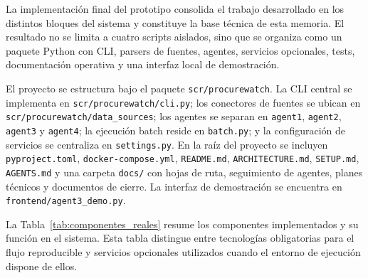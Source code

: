 \documentclass[11pt,a4paper,spanish]{book}
\numberwithin{equation}{chapter}
\numberwithin{figure}{chapter}
\begin{document}
La implementaci{\'o}n final del prototipo consolida el trabajo desarrollado en los distintos bloques
del sistema y constituye la base t{\'e}cnica de esta memoria. El resultado no se limita a cuatro
scripts aislados, sino que se organiza como un paquete Python con CLI, parsers de fuentes, agentes,
servicios opcionales, tests, documentaci{\'o}n operativa y una interfaz local de demostraci{\'o}n.

El proyecto se estructura bajo el paquete \texttt{scr/procurewatch}. La CLI central se implementa
en \texttt{scr/procurewatch/cli.py}; los conectores de fuentes se ubican en
\texttt{scr/procurewatch/data\_sources}; los agentes se separan en
\texttt{agent1}, \texttt{agent2}, \texttt{agent3} y \texttt{agent4}; la ejecuci{\'o}n batch reside en
\texttt{batch.py}; y la configuraci{\'o}n de servicios se centraliza en \texttt{settings.py}. En la
ra{\'i}z del proyecto se incluyen \texttt{pyproject.toml}, \texttt{docker-compose.yml},
\texttt{README.md}, \texttt{ARCHITECTURE.md}, \texttt{SETUP.md}, \texttt{AGENTS.md} y una carpeta
\texttt{docs/} con hojas de ruta, seguimiento de agentes, planes t{\'e}cnicos y documentos de
cierre. La interfaz de demostraci{\'o}n se encuentra en \texttt{frontend/agent3\_demo.py}.

La Tabla~\ref{tab:componentes_reales} resume los componentes implementados y su funci{\'o}n
en el sistema. Esta tabla distingue entre tecnolog{\'i}as obligatorias para el flujo reproducible y
servicios opcionales utilizados cuando el entorno de ejecuci{\'o}n dispone de ellos.
\end{document}

